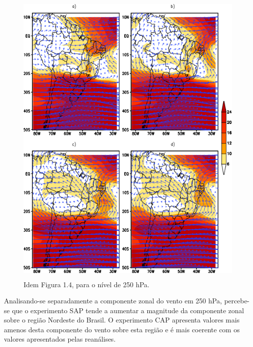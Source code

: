 \begin{figure}[!hbp]
\centering
\includegraphics[height=15cm]{./figs/media_ventos_anl_250hPa.png}
\caption{Idem Figura 1.4, para o nível de 250 hPa.}
\label{fig36}
\end{figure}

Analisando-se separadamente a componente zonal do vento em 250 hPa, percebe-se que o experimento SAP tende a aumentar a magnitude da componente zonal sobre o região Nordeste do Brasil. O experimento CAP apresenta valores mais amenos desta componente do vento sobre esta região e é mais coerente com os valores apresentados pelas reanálises.

